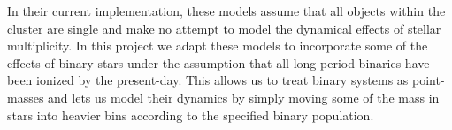 In their current implementation, these models assume that all objects within the cluster are single
and make no attempt to model the dynamical effects of stellar multiplicity. In this project we adapt
these models to incorporate some of the effects of binary stars under the assumption that all
long-period binaries have been ionized by the present-day. This allows us to treat binary systems as
point-masses and lets us model their dynamics by simply moving some of the mass in  stars into
heavier bins according to the specified binary population.